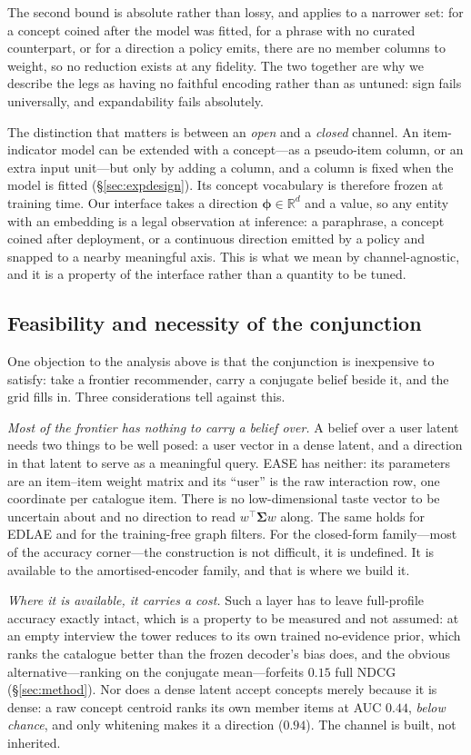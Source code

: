 \documentclass[11pt]{article}
\newcommand{\R}{\mathbb{R}}
\newcommand{\bphi}{\boldsymbol{\phi}}
\newcommand{\bSigma}{\boldsymbol{\Sigma}}
\begin{document}
The second bound is absolute rather than lossy, and applies to a narrower set: for a concept coined after the
model was fitted, for a phrase with no curated counterpart, or for a direction a policy emits, there are no
member columns to weight, so no reduction exists at any fidelity. The two together are why we describe the legs
as having no faithful encoding rather than as untuned: sign fails universally, and expandability fails
absolutely.

The distinction that matters is between an \emph{open} and a \emph{closed} channel. An item-indicator model can be
extended with a concept---as a pseudo-item column, or an extra input unit---but only by adding a column, and a column
is fixed when the model is fitted (\S\ref{sec:expdesign}). Its concept vocabulary is therefore frozen at training
time. Our interface takes a direction $\bphi\in\R^{d}$ and a value, so any entity with an embedding is a legal
observation at inference: a paraphrase, a concept coined after deployment, or a continuous direction emitted by a
policy and snapped to a nearby meaningful axis. This is what we mean by channel-agnostic, and it is a property of the
interface rather than a quantity to be tuned.

\subsection{Feasibility and necessity of the conjunction}\label{sec:gap:why}

One objection to the analysis above is that the conjunction is inexpensive to satisfy: take a frontier
recommender, carry a conjugate belief beside it, and the grid fills in. Three considerations tell against
this.

\emph{Most of the frontier has nothing to carry a belief over.} A belief over a user latent needs two
things to be well posed: a user vector in a dense latent, and a direction in that latent to serve as a
meaningful query. EASE has neither: its parameters are an item--item weight matrix and its ``user'' is the
raw interaction row, one coordinate per catalogue item. There is no low-dimensional taste vector to be
uncertain about and no direction to read $w^\top\bSigma w$ along. The same holds for EDLAE and for the
training-free graph filters. For the closed-form family---most of the accuracy corner---the construction is
not difficult, it is undefined. It is available to the amortised-encoder family, and that is where we build
it.

\emph{Where it is available, it carries a cost.} Such a layer has to leave full-profile accuracy exactly intact,
which is a property to be measured and not assumed: at an empty interview the tower reduces to its own
trained no-evidence prior, which ranks the catalogue better than the frozen decoder's bias does, and the
obvious alternative---ranking on the conjugate mean---forfeits $0.15$ full NDCG (\S\ref{sec:method}). Nor does a dense latent accept concepts
merely because it is dense: a raw concept centroid ranks its own member items at AUC $0.44$, \emph{below
chance}, and only whitening makes it a direction ($0.94$). The channel is built, not inherited.
\end{document}
